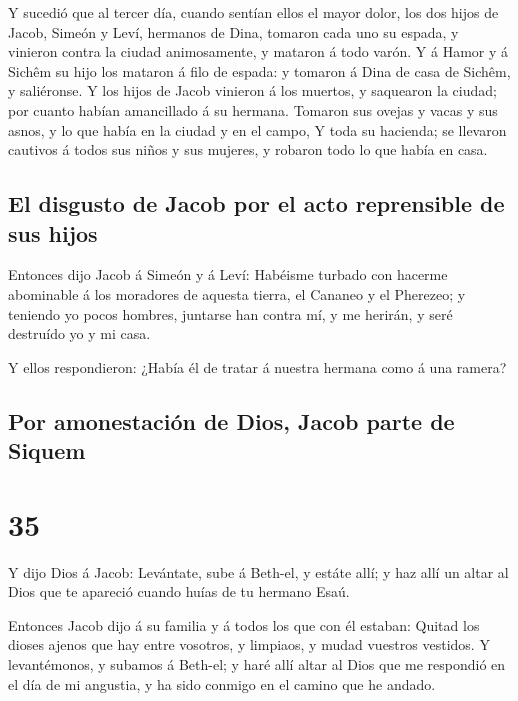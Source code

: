  Y sucedió que al tercer día, cuando sentían ellos el mayor
dolor, los dos hijos de Jacob, Simeón y Leví, hermanos de Dina, tomaron
cada uno su espada, y vinieron contra la ciudad animosamente, y mataron
á todo varón.  Y á Hamor y á Sichêm su hijo los mataron á
filo de espada: y tomaron á Dina de casa de Sichêm, y saliéronse.
 Y los hijos de Jacob vinieron á los muertos, y saquearon
la ciudad; por cuanto habían amancillado á su hermana. 
Tomaron sus ovejas y vacas y sus asnos, y lo que había en la ciudad y en
el campo,  Y toda su hacienda; se llevaron cautivos á todos
sus niños y sus mujeres, y robaron todo lo que había en casa.

\hypertarget{el-disgusto-de-jacob-por-el-acto-reprensible-de-sus-hijos}{%
\subsection{El disgusto de Jacob por el acto reprensible de sus
hijos}\label{el-disgusto-de-jacob-por-el-acto-reprensible-de-sus-hijos}}

 Entonces dijo Jacob á Simeón y á Leví: Habéisme turbado
con hacerme abominable á los moradores de aquesta tierra, el Cananeo y
el Pherezeo; y teniendo yo pocos hombres, juntarse han contra mí, y me
herirán, y seré destruído yo y mi casa.

 Y ellos respondieron: ¿Había él de tratar á nuestra
hermana como á una ramera?

\hypertarget{por-amonestaciuxf3n-de-dios-jacob-parte-de-siquem}{%
\subsection{Por amonestación de Dios, Jacob parte de
Siquem}\label{por-amonestaciuxf3n-de-dios-jacob-parte-de-siquem}}

\hypertarget{section-34}{%
\section{35}\label{section-34}}

 Y dijo Dios á Jacob: Levántate, sube á Beth-el, y estáte
allí; y haz allí un altar al Dios que te apareció cuando huías de tu
hermano Esaú.

 Entonces Jacob dijo á su familia y á todos los que con él
estaban: Quitad los dioses ajenos que hay entre vosotros, y limpiaos, y
mudad vuestros vestidos.  Y levantémonos, y subamos á
Beth-el; y haré allí altar al Dios que me respondió en el día de mi
angustia, y ha sido conmigo en el camino que he andado.

